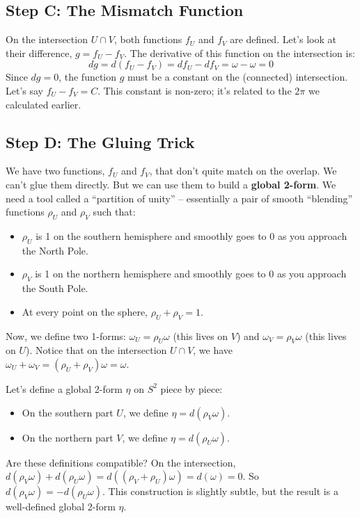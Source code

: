 \documentclass[12pt, letterpaper]{article}
\begin{document}
	\subsection{Step C: The Mismatch Function}
	On the intersection $U \cap V$, both functions $f_U$ and $f_V$ are defined. Let's look at their difference, $g = f_U - f_V$. The derivative of this function on the intersection is:
	\begin{equation*}
		dg = d(f_U - f_V) = df_U - df_V = \omega - \omega = 0
	\end{equation*}
	Since $dg=0$, the function $g$ must be a constant on the (connected) intersection. Let's say $f_U - f_V = C$. This constant is non-zero; it's related to the $2\pi$ we calculated earlier.
	
	\subsection{Step D: The Gluing Trick}
	We have two functions, $f_U$ and $f_V$, that don't quite match on the overlap. We can't glue them directly. But we can use them to build a \textbf{global 2-form}. We need a tool called a ``partition of unity'' -- essentially a pair of smooth ``blending'' functions $\rho_U$ and $\rho_V$ such that:
	\begin{itemize}
		\item $\rho_U$ is 1 on the southern hemisphere and smoothly goes to 0 as you approach the North Pole.
		\item $\rho_V$ is 1 on the northern hemisphere and smoothly goes to 0 as you approach the South Pole.
		\item At every point on the sphere, $\rho_U + \rho_V = 1$.
	\end{itemize}
	Now, we define two 1-forms: $\omega_U = \rho_U \omega$ (this lives on $V$) and $\omega_V = \rho_V \omega$ (this lives on $U$). Notice that on the intersection $U \cap V$, we have $\omega_U + \omega_V = (\rho_U + \rho_V)\omega = \omega$.
	
	Let's define a global 2-form $\eta$ on $S^2$ piece by piece:
	\begin{itemize}
		\item On the southern part $U$, we define $\eta = d(\rho_V \omega)$.
		\item On the northern part $V$, we define $\eta = d(\rho_U \omega)$.
	\end{itemize}
	Are these definitions compatible? On the intersection, $d(\rho_V \omega) + d(\rho_U \omega) = d((\rho_V+\rho_U)\omega) = d(\omega) = 0$. So $d(\rho_V \omega) = -d(\rho_U \omega)$. This construction is slightly subtle, but the result is a well-defined global 2-form $\eta$.
	
\end{document}
